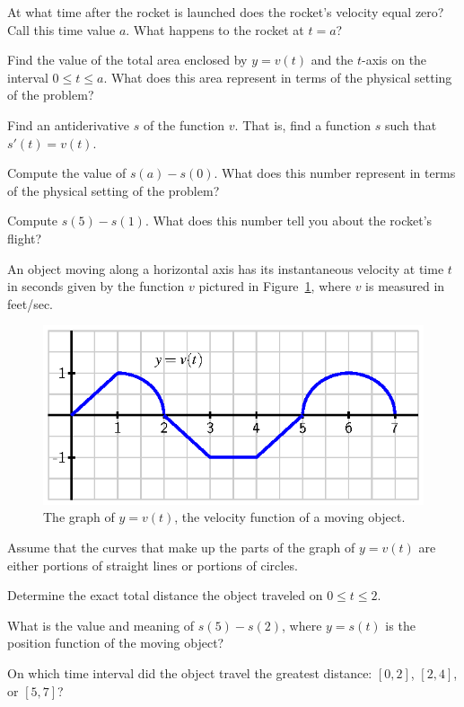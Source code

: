 \begin{exercises}
  \ba
  	\item At what time after the rocket is launched does the rocket's velocity equal zero?  Call this time value $a$.  What happens to the rocket at $t = a$?
	\item Find the value of the total area enclosed by $y = v(t)$ and the $t$-axis on the interval $0 \le t \le a$.  What does this area represent in terms of the physical setting of the problem?
	\item Find an antiderivative $s$ of the function $v$.  That is, find a function $s$ such that $s'(t) = v(t)$.
	\item Compute the value of $s(a) - s(0)$.  What does this number represent in terms of the physical setting of the problem?
	\item Compute $s(5) - s(1)$.  What does this number tell you about the rocket's flight?
  \ea
  \item An object moving along a horizontal axis has its instantaneous velocity at time $t$ in seconds given by the function $v$ pictured in Figure~\ref{F:4.1.Ez3}, where $v$ is measured in feet/sec.
  \begin{figure}[h]
\begin{center}
\includegraphics{figures/4_1_Ez3.eps}
\caption{The graph of $y = v(t)$, the velocity function of a moving object.} \label{F:4.1.Ez3}
\end{center}
\end{figure}
Assume that the curves that make up the parts of the graph of $y=v(t)$ are either portions of straight lines or portions of circles.
 \ba
 	\item Determine the exact total distance the object traveled on $0 \le t \le 2$.
	\item What is the value and meaning of $s(5) - s(2)$, where $y = s(t)$ is the position function of the moving object?
	\item On which time interval did the object travel the greatest distance: $[0,2]$, $[2,4]$, or $[5,7]$?

\end{exercises}
